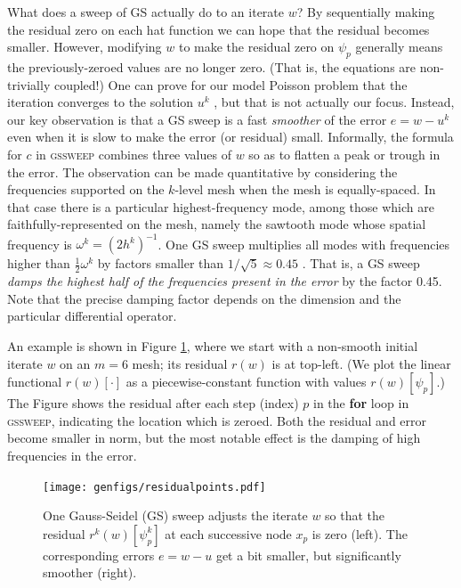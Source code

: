 \documentclass[letterpaper,final,12pt,reqno]{amsart}
\numberwithin{equation}{section}
\numberwithin{figure}{section}
\numberwithin{table}{section}
\begin{document}
What does a sweep of GS actually do to an iterate $w$?  By sequentially making the residual zero on each hat function we can hope that the residual becomes smaller.  However, modifying $w$ to make the residual zero on $\psi_p$ generally means the previously-zeroed values are no longer zero.  (That is, the equations are non-trivially coupled!)  One can prove for our model Poisson problem that the iteration converges to the solution $u^k$ \cite[for example]{Greenbaum1997}, but that is not actually our focus.  Instead, our key observation is that a GS sweep is a fast \emph{smoother} of the error $e=w-u^k$ even when it is slow to make the error (or residual) small.  Informally, the formula for $c$ in \textsc{gssweep} combines three values of $w$ so as to flatten a peak or trough in the error.  The observation can be made quantitative by considering the frequencies supported on the $k$-level mesh when the mesh is equally-spaced.  In that case there is a particular highest-frequency mode, among those which are faithfully-represented on the mesh, namely the sawtooth mode whose spatial frequency is $\omega^k=(2h^k)^{-1}$.  One GS sweep multiplies all modes with frequencies higher than $\frac{1}{2} \omega^k$ by factors smaller than $1/\sqrt{5}\approx 0.45$ \cite[Chapter 4]{Briggsetal2000}.  That is, a GS sweep \emph{damps the highest half of the frequencies present in the error} by the factor 0.45.  Note that the precise damping factor depends on the dimension and the particular differential operator.

An example is shown in Figure \ref{fig:residualpoints}, where we start with a non-smooth initial iterate $w$ on an $m=6$ mesh; its residual $r(w)$ is at top-left.  (We plot the linear functional $r(w)[\cdot]$ as a piecewise-constant function with values $r(w)[\psi_p]$.)  The Figure shows the residual after each step (index) $p$ in the \textbf{for} loop in \textsc{gssweep}, indicating the location which is zeroed.  Both the residual and error become smaller in norm, but the most notable effect is the damping of high frequencies in the error.

\begin{figure}[t]
\texttt{[image: genfigs/residualpoints.pdf]}
\caption{One Gauss-Seidel (GS) sweep adjusts the iterate $w$ so that the residual $r^k(w)[\psi_p^k]$ at each successive node $x_p$ is zero (left).  The corresponding errors $e=w-u$ get a bit smaller, but significantly smoother (right).}
\label{fig:residualpoints}
\end{figure}
\end{document}
